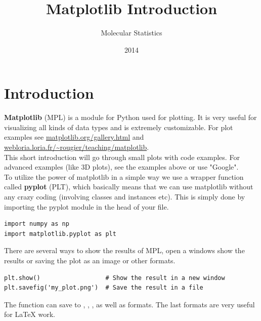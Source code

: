 \documentclass{article}
\title{Matplotlib Introduction}
\author{Molecular Statistics}
\date{2014}
\begin{document}

\maketitle

\section{Introduction}

{\bf Matplotlib} (MPL) is a module for Python used for plotting.
It is very useful for visualizing all kinds of data types and is extremely customizable.
For plot examples see 
\href{http://matplotlib.org/gallery.html}{matplotlib.org/gallery.html} and
\href{http://webloria.loria.fr/~rougier/teaching/matplotlib/}{webloria.loria.fr/\~{}rougier/teaching/matplotlib}. \\

This short introduction will go through small plots with code examples. For advanced examples (like 3D plots), see the examples above or use "Google".\\

To utilize the power of matplotlib in a simple way we use a wrapper function called {\bf pyplot} (PLT), which basically means that we can use matplotlib without any crazy coding (involving classes and instances etc).
This is simply done by importing the pyplot module in the head of your  file.

\begin{lstlisting}
import numpy as np
import matplotlib.pyplot as plt
\end{lstlisting}

There are several ways to show the results of MPL, open a windows show the results or saving the plot as an image or other formats.

\begin{lstlisting}
plt.show()                  # Show the result in a new window
plt.savefig('my_plot.png')  # Save the result in a file
\end{lstlisting}


The  function can save to
,
,
,
as well as
 formats. The last formats are very useful for {\LaTeX} work.\\
\end{document}
